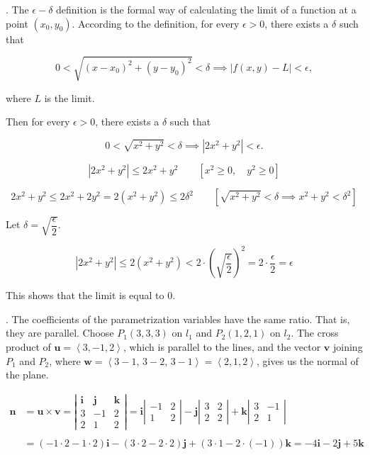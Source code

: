 \documentclass{article}
\begin{document}
\hfill

. The $\epsilon-\delta$ definition is the formal way of calculating the limit of a function at a point $(x_0,y_0)$. According to the definition, for every $\epsilon>0$, there exists a $\delta$ such that

\[0<\sqrt{(x-x_0)^2+(y-y_0)^2}<\delta\implies\left|f(x,y)-L\right|<\epsilon,\]

\hfill

\noindent where $L$ is the limit.

\hfill

\noindent Then for every $\epsilon>0$, there exists a $\delta$ such that

\[0<\sqrt{x^2+y^2}<\delta\implies\left|2x^2+y^2\right|<\epsilon.\]

\[\left|2x^2+y^2\right|\leq2x^2+y^2\qquad\left[x^2\geq0,\quad y^2\geq0\right]\]

\[2x^2+y^2\leq2x^2+2y^2=2\left(x^2+y^2\right)\leq2\delta^2\qquad\left[\sqrt{x^2+y^2}<\delta\implies  x^2+y^2<\delta^2\right]\]

\hfill

\noindent Let $\delta=\sqrt{\dfrac{\epsilon}2}$.

\[\left|2x^2+y^2\right|\leq2\left(x^2+y^2\right)<2\cdot\left(\sqrt{\frac{\epsilon}2}\right)^2=2\cdot\frac{\epsilon}2=\epsilon\]

\hfill

\noindent This shows that the limit is equal to $0$.

\hfill

. The coefficients of the parametrization variables have the same ratio. That is, they are parallel. Choose $P_1(3,3,3)$ on $l_1$ and $P_2(1,2,1)$ on $l_2$. The cross product of $\mathbf u=\left\langle3,-1,2\right\rangle$, which is parallel to the lines, and the vector $\mathbf v$ joining $P_1$ and $P_2$, where $\mathbf w=\left\langle3-1,\,3-2,\,3-1\right\rangle=\left\langle2,1,2\right\rangle$, gives us the normal of the plane.

\begin{align*}\mathbf n&=\mathbf{u}\times\mathbf{v}=\left|\begin{array}{ccc}
\mathbf{i}&\mathbf{j}&\mathbf{k}\\
3&-1&2\\
2&1&2
\end{array}\right|=\mathbf{i}\left|\begin{array}{cc}
-1&2\\1&2
\end{array}\right|-\mathbf{j}\left|\begin{array}{cc}
3&2\\2&2
\end{array}\right|+\mathbf{k}\left|\begin{array}{cc}
3&-1\\2&1
\end{array}\right|\\\\&=(-1\cdot2-1\cdot2)\mathbf{i}-(3\cdot2-2\cdot2)\mathbf{j}+(3\cdot1-2\cdot(-1))\mathbf{k}=-4\mathbf i-2\mathbf j+5\mathbf k\end{align*}
\end{document}
